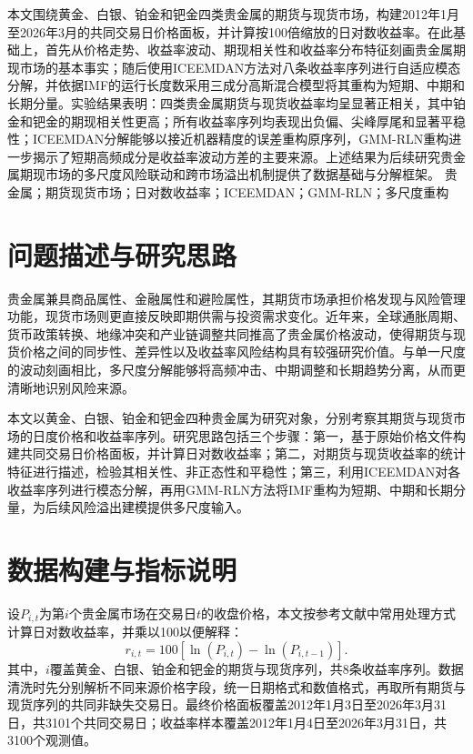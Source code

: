 
\makecover

\makeabstractpage
{本文围绕黄金、白银、铂金和钯金四类贵金属的期货与现货市场，构建2012年1月至2026年3月的共同交易日价格面板，并计算按100倍缩放的日对数收益率。在此基础上，首先从价格走势、收益率波动、期现相关性和收益率分布特征刻画贵金属期现市场的基本事实；随后使用ICEEMDAN方法对八条收益率序列进行自适应模态分解，并依据IMF的运行长度数采用三成分高斯混合模型将其重构为短期、中期和长期分量。实验结果表明：四类贵金属期货与现货收益率均呈显著正相关，其中铂金和钯金的期现相关性更高；所有收益率序列均表现出负偏、尖峰厚尾和显著平稳性；ICEEMDAN分解能够以接近机器精度的误差重构原序列，GMM-RLN重构进一步揭示了短期高频成分是收益率波动方差的主要来源。上述结果为后续研究贵金属期现市场的多尺度风险联动和跨市场溢出机制提供了数据基础与分解框架。}
{贵金属；期货现货市场；日对数收益率；ICEEMDAN；GMM-RLN；多尺度重构}

\makemaincontents
\makefigtablelist

\startmainmatter

\section{问题描述与研究思路}
贵金属兼具商品属性、金融属性和避险属性，其期货市场承担价格发现与风险管理功能，现货市场则更直接反映即期供需与投资需求变化。近年来，全球通胀周期、货币政策转换、地缘冲突和产业链调整共同推高了贵金属价格波动，使得期货与现货价格之间的同步性、差异性以及收益率风险结构具有较强研究价值。与单一尺度的波动刻画相比，多尺度分解能够将高频冲击、中期调整和长期趋势分离，从而更清晰地识别风险来源。

本文以黄金、白银、铂金和钯金四种贵金属为研究对象，分别考察其期货与现货市场的日度价格和收益率序列。研究思路包括三个步骤：第一，基于原始价格文件构建共同交易日价格面板，并计算日对数收益率；第二，对期货与现货收益率的统计特征进行描述，检验其相关性、非正态性和平稳性；第三，利用ICEEMDAN对各收益率序列进行模态分解，再用GMM-RLN方法将IMF重构为短期、中期和长期分量，为后续风险溢出建模提供多尺度输入。

\section{数据构建与指标说明}
设$P_{i,t}$为第$i$个贵金属市场在交易日$t$的收盘价格，本文按参考文献中常用处理方式计算日对数收益率，并乘以100以便解释：
\begin{equation}
  r_{i,t}=100\left[\ln(P_{i,t})-\ln(P_{i,t-1})\right].
\end{equation}
其中，$i$覆盖黄金、白银、铂金和钯金的期货与现货序列，共8条收益率序列。数据清洗时先分别解析不同来源价格字段，统一日期格式和数值格式，再取所有期货与现货序列的共同非缺失交易日。最终价格面板覆盖2012年1月3日至2026年3月31日，共3101个共同交易日；收益率样本覆盖2012年1月4日至2026年3月31日，共3100个观测值。

